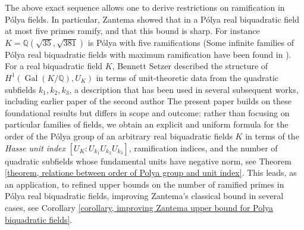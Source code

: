 \documentclass{jams-l}
\theoremstyle{definition}
\theoremstyle{remark}
\numberwithin{equation}{section}
\DeclareMathOperator{\Gal}{Gal}
\begin{document}
The above exact sequence allows one to derive restrictions on ramification in P\'olya fields. In particular, Zantema \cite[Section 5]{Zantema} showed that in a P\'olya real biquadratic field
at most five primes ramify, and that this bound is sharp.
For instance $K=\mathbb{Q}(\sqrt{35}, \sqrt{381})$ is P\'olya with five ramifications \cite[page 20]{Zantema} (Some infinite families of P\'olya real biquadratic fields with maximum ramification have been found in \cite{MaarefJNT2021}). For a real biquadratic field $K$, Bennett Setzer \cite{Bennett} described the structure of $H^1(\Gal(K/\mathbb{Q}),U_K)$ in terms of unit-theoretic data from the quadratic subfields $k_1,k_2,k_3$, a description that has been used in several subsequent works, including earlier paper of the second author \cite{MaarefJNT2021} The present paper builds on these foundational results but differs in scope and outcome: rather than focusing on particular families of fields, we obtain an explicit and uniform formula for the order of the P\'olya group of an arbitrary real biquadratic fields $K$ in terms of the
\emph{Hasse unit index} $	\left[U_K : U_{k_1} U_{k_2} U_{k_3}\right]$, ramification indices, and the number of quadratic subfields whose fundamental units have negative norm, see Theorem \ref{theorem, relatione between order of Polya group and unit index}. This leads, as an application, to refined upper bounds on the number of ramified primes in Pólya real biquadratic fields, improving Zantema’s classical bound in several cases, see Corollary \ref{corollary, improving Zantema upper bound for Polya biquadratic fields}.



\iffalse 
\end{document}
